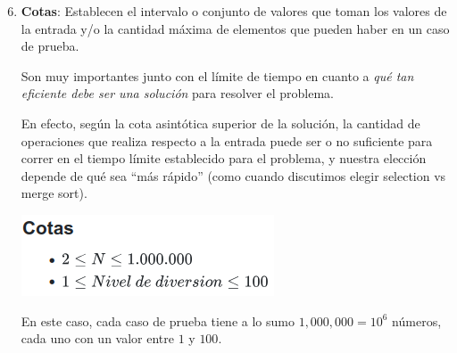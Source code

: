 \documentclass{beamer}
\begin{document}
    \begin{frame}[noframenumbering]
        \begin{enumerate}
            \setcounter{enumi}{5}
            \item \textbf{Cotas}: \pause Establecen el intervalo o conjunto de valores que toman los valores de la entrada y/o la cantidad máxima de elementos que pueden haber en un caso de prueba. \pause 

            Son muy importantes junto con el límite de tiempo en cuanto a \textit{qué tan eficiente debe ser una solución} para resolver el problema. \pause 

            En efecto, según la cota asintótica superior de la solución, la cantidad de operaciones que realiza respecto a la entrada puede ser o no suficiente para correr en el tiempo límite establecido para el problema, y nuestra elección depende de qué sea ``más rápido'' (como cuando discutimos elegir selection vs merge sort).\pause
            \begin{center}
                \includegraphics[width=.4\linewidth]{./res/ou_restrictions.png}
            \end{center}\pause

            En este caso, cada caso de prueba tiene a lo sumo $1,000,000 = 10^6$ números, cada uno con un valor entre $1$ y $100$.
        \end{enumerate}
    \end{frame}
 
\end{document}
